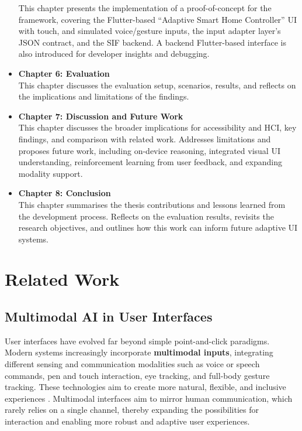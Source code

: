 \documentclass[openany]{book}
\begin{document}
\begin{itemize}
    This chapter presents the implementation of a proof-of-concept for the framework, covering the Flutter-based “Adaptive Smart Home Controller” UI with touch, and simulated voice/gesture inputs, the input adapter layer’s JSON contract, and the SIF backend. A backend Flutter-based interface is also introduced for developer insights and debugging.
    \item \textbf{Chapter 6: Evaluation} \\
    This chapter discusses the evaluation setup, scenarios, results, and reflects on the implications and limitations of the findings.
    \item \textbf{Chapter 7: Discussion and Future Work} \\
    This chapter discusses the broader implications for accessibility and HCI, key findings, and comparison with related work. Addresses limitations and proposes future work, including on-device reasoning, integrated visual UI understanding, reinforcement learning from user feedback, and expanding modality support.
    \item \textbf{Chapter 8: Conclusion} \\
    This chapter summarises the thesis contributions and lessons learned from the development process. Reflects on the evaluation results, revisits the research objectives, and outlines how this work can inform future adaptive UI systems.
\end{itemize}

\chapter{Related Work}
\section{Multimodal AI in User Interfaces}

User interfaces have evolved far beyond simple point-and-click paradigms. Modern systems increasingly incorporate \textbf{multimodal inputs}, integrating different sensing and communication modalities such as voice or speech commands, pen and touch interaction, eye tracking, and full-body gesture tracking. These technologies aim to create more natural, flexible, and inclusive experiences \cite{10.1145/319382.319398}. Multimodal interfaces aim to mirror human communication, which rarely relies on a single channel, thereby expanding the possibilities for interaction and enabling more robust and adaptive user experiences. 
\end{document}
